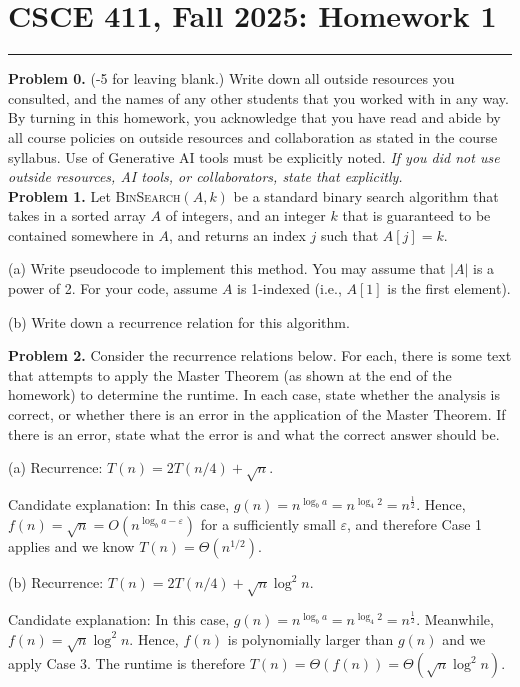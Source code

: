 \documentclass[12pt]{article}  %
\begin{document}
\section*{CSCE 411, Fall 2025: Homework 1}
\rule{\textwidth}{0.4pt}

\textbf{Problem 0.} (-5 for leaving blank.) Write down all outside resources you consulted, and the names of any other students that you worked with in any way. By turning in this homework, you acknowledge that you have read and abide by all course policies on outside resources and collaboration as stated in the course syllabus. Use of Generative AI tools must be explicitly noted. \textit{If you did not use outside resources, AI tools, or collaborators, state that explicitly.}\\

\textbf{Problem 1.} Let \textsc{BinSearch}$(A,k)$ be a standard binary search algorithm that takes in a {sorted} array $A$ of integers, and an integer $k$ that is guaranteed to be contained somewhere in $A$, and returns an index $j$ such that $A[j] = k$. 

(a) Write pseudocode to implement this method. You may assume that $|A|$ is a power of 2. For your code, assume $A$ is 1-indexed (i.e., $A[1]$ is the first element).

(b) Write down a recurrence relation for this algorithm.

\textbf{Problem 2.} Consider the recurrence relations below. For each, there is some text that attempts to apply the Master Theorem (as shown at the end of the homework) to determine the runtime. In each case, state whether the analysis is correct, or whether there is an error in the application of the Master Theorem. If there is an error, state what the error is and what the correct answer should be.

(a) Recurrence: $T(n) = 2T(n/4)+ \sqrt{n}$.

Candidate explanation: In this case, $g(n) = n^{\log_b a} = n^{\log_4 2} = n^{\frac{1}{2}}$. Hence, $f(n) = \sqrt{n} = O(n^{\log_b a - \varepsilon})$ for a sufficiently small $\varepsilon$, and therefore Case 1 applies and we know $T(n) = \Theta(n^{1/2})$. 

(b) Recurrence: $T(n) = 2T(n/4)+ \sqrt{n} \log^2 n$.

Candidate explanation: In this case, $g(n) = n^{\log_b a} = n^{\log_4 2} = n^{\frac{1}{2}}$. Meanwhile, $f(n) = \sqrt{n} \log^2 n$. Hence, $f(n)$ is polynomially larger than $g(n)$ and we apply Case 3. The runtime is therefore $T(n) = \Theta(f(n)) = \Theta(\sqrt{n} \log^2 n)$.
\end{document}
